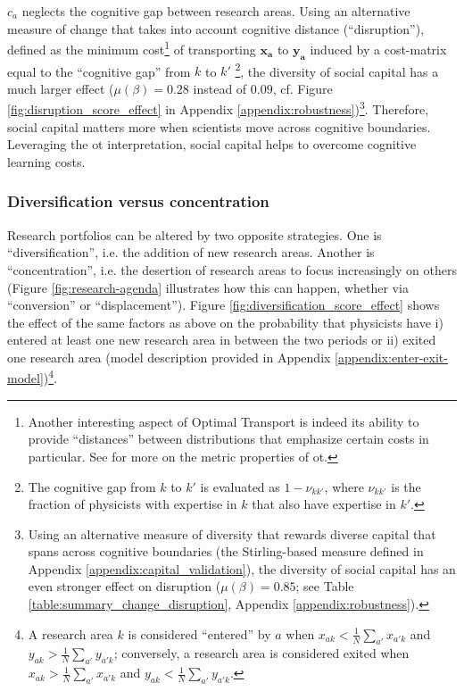 \documentclass{article}
\begin{document}
$c_a$ neglects the cognitive gap between research areas. Using an alternative measure of change that takes into account cognitive distance (``disruption''), defined as the minimum cost\footnote{Another interesting aspect of Optimal Transport is indeed its ability to provide ``distances'' between distributions that emphasize certain costs in particular. See \citealt{Peyre2018} for more on the metric properties of \gls{ot}.} of transporting $\bm{x_a}$ to $\bm{y_a}$ \citep{Peyr2019} induced by a cost-matrix equal to the ``cognitive gap'' from $k$ to $k'$ \footnote{The cognitive gap from $k$ to $k'$ is evaluated as $1-\nu_{kk'}$, where $\nu_{kk'}$ is the fraction of physicists with expertise in $k$ that also have expertise in $k'$.},  the diversity of social capital has a much larger effect ($\mu(\beta)=0.28$ instead of $0.09$, cf. Figure \ref{fig:disruption_score_effect} in Appendix \ref{appendix:robustness})\footnote{Using an alternative measure of diversity that rewards diverse capital that spans across cognitive boundaries (the Stirling-based measure defined in Appendix \ref{appendix:capital_validation}), the diversity of social capital has an even stronger effect on disruption ($\mu(\beta)=0.85$; see Table \ref{table:summary_change_disruption}, Appendix \ref{appendix:robustness}).}. Therefore, social capital matters more when scientists move across cognitive boundaries. Leveraging the \gls{ot} interpretation, social capital helps to overcome cognitive learning costs. 


\subsubsection{Diversification versus concentration}

Research portfolios can be altered by two opposite strategies. One is ``diversification'', i.e. the addition of new research areas. Another is ``concentration'', i.e. the desertion of research areas to focus increasingly on others (Figure \ref{fig:research-agenda} illustrates how this can happen, whether via ``conversion'' or ``displacement''). Figure \ref{fig:diversification_score_effect} shows the effect of the same factors as above on the probability that physicists have i) entered at least one new research area in between the two periods or ii) exited one research area (model description provided in Appendix \ref{appendix:enter-exit-model})\footnote{A research area $k$ is considered ``entered'' by $a$ when $x_{ak}<\frac{1}{N}\sum_{a'}x_{a'k}$ and $y_{ak}>\frac{1}{N}\sum_{a'}y_{a'k}$; conversely, a research area is considered exited when $x_{ak}>\frac{1}{N}\sum_{a'}x_{a'k}$ and $y_{ak}<\frac{1}{N}\sum_{a'}y_{a'k}$.}.
\end{document}
